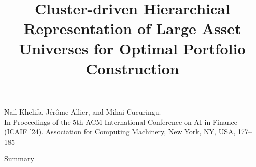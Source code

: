 \documentclass[dvipsnames,mathserif]{beamer}
\begin{document}
\rightskip\rightmargin
\title{Cluster-driven Hierarchical Representation of Large Asset Universes for Optimal Portfolio Construction}



\begin{frame}
\maketitle
\begin{center}
\footnotesize
    Nail Khelifa, Jérôme Allier, and Mihai Cucuringu. \\
    In Proceedings of the 5th ACM International Conference on AI in Finance (ICAIF '24). Association for Computing Machinery, New York, NY, USA, 177–185
\end{center}
\end{frame}

\begin{frame}{Summary}
\footnotesize \tableofcontents
\end{frame}
\end{document}
